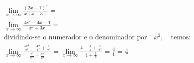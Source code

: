 \begin{ex}
\begin{align}
&\lim_{x\rightarrow \infty} \frac{(2x-1)^2}{x(x+3)}=\nonumber\\
&\lim_{x\rightarrow \infty} \frac{4x^2-4x+1}{x^2+3x}=\nonumber\\
&\text{dividindo-se o numerador e o denominador por}\quad x^2,\quad\text{temos:}\nonumber\\
&\lim_{x\rightarrow \infty} \frac{\frac{4x^2}{x^2}-\frac{4x}{x^2}+\frac{1}{x^2}}{\frac{x^2}{x^2}+\frac{3x}{x^2}}=\lim_{x\rightarrow \infty} \frac{4-\frac{4}{x}+\frac{1}{x^2}}{1+\frac{3}{x}}=\frac{4}{1}=4\nonumber
\end{align}
\end{ex}
